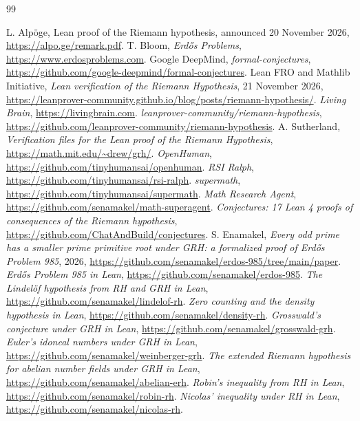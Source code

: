 \documentclass[11pt]{amsart}
\begin{document}
\begin{thebibliography}{99}
\raggedright
{} L. Alp\"oge, Lean proof of the Riemann hypothesis, announced 20 November 2026, \url{https://alpo.ge/remark.pdf}.
 T. Bloom, \emph{Erd\H{o}s Problems}, \url{https://www.erdosproblems.com}.
 Google DeepMind, \emph{formal-conjectures}, \url{https://github.com/google-deepmind/formal-conjectures}.
 Lean FRO and Mathlib Initiative, \emph{Lean verification of the Riemann Hypothesis}, 21 November 2026, \url{https://leanprover-community.github.io/blog/posts/riemann-hypothesis/}.
 \emph{Living Brain}, \url{https://livingbrain.com}.
 \emph{leanprover-community/riemann-hypothesis}, \url{https://github.com/leanprover-community/riemann-hypothesis}.
 A. Sutherland, \emph{Verification files for the Lean proof of the Riemann Hypothesis}, \url{https://math.mit.edu/~drew/grh/}.
 \emph{OpenHuman}, \url{https://github.com/tinyhumansai/openhuman}.
 \emph{RSI Ralph}, \url{https://github.com/tinyhumansai/rsi-ralph}.
 \emph{supermath}, \url{https://github.com/tinyhumansai/supermath}.
 \emph{Math Research Agent}, \url{https://github.com/senamakel/math-superagent}.
 \emph{Conjectures: 17 Lean 4 proofs of consequences of the Riemann hypothesis}, \url{https://github.com/ChatAndBuild/conjectures}.
 S. Enamakel, \emph{Every odd prime has a smaller prime primitive root under GRH: a formalized proof of Erd\H{o}s Problem 985}, 2026, \url{https://github.com/senamakel/erdos-985/tree/main/paper}.
 \emph{Erd\H{o}s Problem 985 in Lean}, \url{https://github.com/senamakel/erdos-985}.
 \emph{The Lindel\"of hypothesis from RH and GRH in Lean}, \url{https://github.com/senamakel/lindelof-rh}.
 \emph{Zero counting and the density hypothesis in Lean}, \url{https://github.com/senamakel/density-rh}.
 \emph{Grosswald's conjecture under GRH in Lean}, \url{https://github.com/senamakel/grosswald-grh}.
 \emph{Euler's idoneal numbers under GRH in Lean}, \url{https://github.com/senamakel/weinberger-grh}.
 \emph{The extended Riemann hypothesis for abelian number fields under GRH in Lean}, \url{https://github.com/senamakel/abelian-erh}.
 \emph{Robin's inequality from RH in Lean}, \url{https://github.com/senamakel/robin-rh}.
 \emph{Nicolas' inequality under RH in Lean}, \url{https://github.com/senamakel/nicolas-rh}.

\end{thebibliography}
\end{document}
